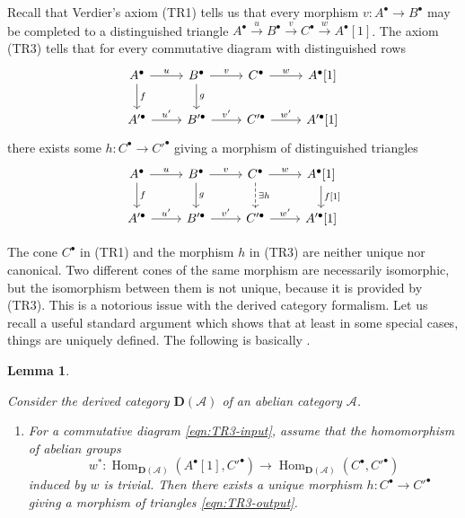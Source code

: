\documentclass{article}
\DeclareMathOperator{\Hom}{Hom}
\newtheorem{lemma}[theorem]{Lemma}
\theoremstyle{definition}
\numberwithin{equation}{section}
\begin{document}
\begin{appendices}
Recall that Verdier's axiom (TR1) tells us that every morphism
$v\colon A^\bullet \to B^\bullet$ may be completed to a distinguished triangle
$A^\bullet \xrightarrow{u} B^\bullet \xrightarrow{v} C^\bullet \xrightarrow{w} A^\bullet [1]$.
The axiom (TR3) tells that for every commutative diagram with
distinguished rows
\begin{equation}
  \label{eqn:TR3-input}
  \begin{tikzcd}
    A^\bullet\ar{r}{u}\ar{d}{f} & B^\bullet\ar{r}{v}\ar{d}{g} & C^\bullet\ar{r}{w} & A^\bullet [1] \\
    A'^\bullet\ar{r}{u'} & B'^\bullet\ar{r}{v'} & C'^\bullet\ar{r}{w'} & A'^\bullet [1]
  \end{tikzcd}
\end{equation}
there exists some $h\colon C^\bullet \to C'^\bullet$ giving a morphism of
distinguished triangles
\begin{equation}
  \label{eqn:TR3-output}
  \begin{tikzcd}
    A^\bullet\ar{r}{u}\ar{d}{f} & B^\bullet\ar{r}{v}\ar{d}{g} & C^\bullet\ar{r}{w}\ar[dashed]{d}{\exists h} & A^\bullet [1]\ar{d}{f [1]} \\
    A'^\bullet\ar{r}{u'} & B'^\bullet\ar{r}{v'} & C'^\bullet\ar{r}{w'} & A'^\bullet [1]
  \end{tikzcd}
\end{equation}

The cone $C^\bullet$ in (TR1) and the morphism $h$ in (TR3) are neither unique
nor canonical. Two different cones of the same morphism are necessarily
isomorphic, but the isomorphism between them is not unique, because it is
provided by (TR3). This is a notorious issue with the derived category
formalism. Let us recall a useful standard argument which shows that at least in
some special cases, things are uniquely defined. The following is basically
\cite[Proposition~1.1.9, Corollaire~1.1.10]{Beilinson-Bernstein-Deligne}.

\begin{lemma}
  \label{TR3-TR1-with-uniqueness-general-statement}

  Consider the derived category $\mathbf{D} (\mathcal{A})$ of an abelian
  category $\mathcal{A}$.

  \begin{enumerate}
  \item[1)] For a commutative diagram \eqref{eqn:TR3-input}, assume that the
    homomorphism of abelian groups
    \[ w^*\colon \Hom_{\mathbf{D} (\mathcal{A})} (A^\bullet [1], C'^\bullet) \to
    \Hom_{\mathbf{D} (\mathcal{A})} (C^\bullet, C'^\bullet) \]
    induced by $w$ is trivial. Then there exists a unique morphism
    $h\colon C^\bullet \to C'^\bullet$ giving a morphism of triangles
    \eqref{eqn:TR3-output}.


\end{enumerate}
\end{lemma}
\end{appendices}
\end{document}
